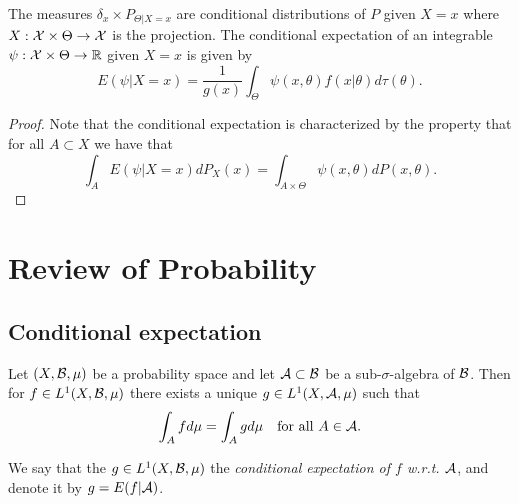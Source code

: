 \documentclass[twoside, a4paper, 10pt]{amsart}
\begin{document}
\begin{lemma} The measures $\delta_x \times P_{\Theta |X=x}$ are conditional distributions of $P$ given $X=x$ where $X:\mathcal{X} \times \Theta \to \mathcal{X}$ is the projection. The conditional expectation of an integrable $\psi:\mathcal{X} \times \Theta \to \mathbb{R}$ given $X=x$ is given by $$E(\psi | X=x) = \frac{1}{g(x)}\int_{\Theta} \psi(x,\theta) f(x|\theta) d\tau(\theta).$$ 

\end{lemma}

\begin{proof} Note that the conditional expectation is characterized by the property that for all $A \subset X$ we have that $$\int_{A} E(\psi |X=x) dP_X(x) = \int_{A \times \Theta} \psi(x,\theta) dP(x, \theta).$$

\end{proof}

\appendix

\section{Review of Probability}

\subsection{Conditional expectation}

\begin{thm} Let $(X, \mathcal{B}, \mu)$ be a probability space and let $\mathcal{A} \subset \mathcal{B}$ be a sub-$\sigma$-algebra of $\mathcal{B}$. Then for $f \in L^1(X,\mathcal{B},\mu)$ there exists a unique $g \in L^1(X,\mathcal{A},\mu)$ such that $$\int_A f d\mu = \int_A g d\mu \quad\text{for all } A\in \mathcal{A}.$$

\end{thm}

\begin{mydef} We say that the $g \in L^1(X,\mathcal{B},\mu)$ the \textit{conditional expectation of $f$ w.r.t. $\mathcal{A}$}, and denote it by $g = E(f|\mathcal{A})$.

\end{mydef}
\end{document}
